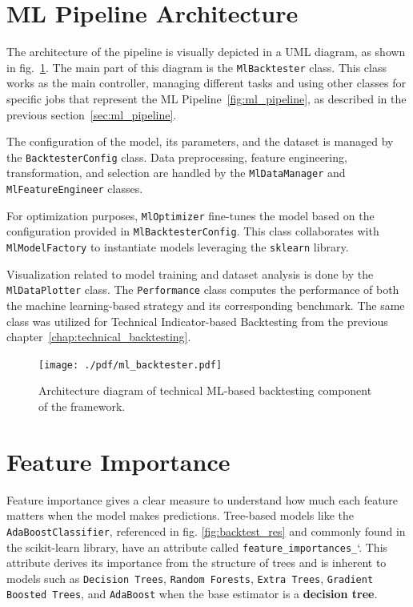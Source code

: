 \section{ML Pipeline Architecture}

The architecture of the pipeline is visually depicted in a UML diagram, as shown in fig.~\ref{fig:ml_backtester}.
The main part of this diagram is the \texttt{MlBacktester} class.
This class works as the main controller, managing different tasks and using other classes for specific jobs that represent the ML Pipeline~\ref{fig:ml_pipeline}, as described in the previous section~\ref{sec:ml_pipeline}.

The configuration of the model, its parameters, and the dataset is managed by the \texttt{BacktesterConfig} class.
Data preprocessing, feature engineering, transformation, and selection are handled by the \texttt{MlDataManager} and \texttt{MlFeatureEngineer} classes.

For optimization purposes, \texttt{MlOptimizer} fine-tunes the model based on the configuration provided in \texttt{MlBacktesterConfig}.
This class collaborates with \texttt{MlModelFactory} to instantiate models leveraging the \texttt{sklearn} library.

Visualization related to model training and dataset analysis is done by the \texttt{MlDataPlotter} class.
The \texttt{Performance} class computes the performance of both the machine learning-based strategy and its corresponding benchmark.
The same class was utilized for Technical Indicator-based Backtesting from the previous chapter~\ref{chap:technical_backtesting}.
\begin{figure}[H]
\centering
\texttt{[image: ./pdf/ml\_backtester.pdf]}
\caption{Architecture diagram of technical ML-based backtesting component of the framework.}
\label{fig:ml_backtester}
\end{figure}

\noindent


\section{Feature Importance}

Feature importance gives a clear measure to understand how much each feature matters when the model makes predictions.
Tree-based models like the  \texttt{AdaBoostClassifier}, referenced in fig. \ref{fig:backtest_res} and commonly found in the scikit-learn library, have an attribute called  \texttt{feature\_importances\_}`.
This attribute derives its importance from the structure of trees and is inherent to models such as  \texttt{Decision Trees},  \texttt{Random Forests},  \texttt{Extra Trees},  \texttt{Gradient Boosted Trees}, and  \texttt{AdaBoost} when the base estimator is a \textbf{decision tree}.

